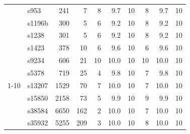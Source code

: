 \begin{table}[t]
\begin{tabular}{c l r r r r r r r r}
  & s953   &   241 &   7 &  8 &  9.7 & 10 &  8 &  9.7 & 10 \\
  & s1196b &   300 &   5 &  6 &  9.2 & 10 &  8 &  9.2 & 10 \\
  & s1238  &   301 &   5 &  6 &  9.2 & 10 &  8 &  9.2 & 10 \\
  & s1423  &   378 &  10 &  6 &  9.6 & 10 &  6 &  9.6 & 10 \\
  & s9234  &   606 &  21 & 10 & 10.0 & 10 & 10 & 10.0 & 10 \\
  & s5378  &   719 &  25 &  4 &  9.8 & 10 &  7 &  9.8 & 10 \\
\cmidrule(lr){1-10}
\multirow{4}{*}{\rotatebox[origin=c]{90}{\textit{Large}}}
  & s13207 &  1529 &  70 &  7 & 10.0 & 10 &  7 & 10.0 & 10 \\
  & s15850 &  2158 &  73 &  5 &  9.9 & 10 &  9 &  9.9 & 10 \\
  & s38584 &  6650 & 162 &  2 & 10.0 & 10 &  7 & 10.0 & 10 \\
  & s35932 &  5255 & 209 &  3 & 10.0 & 10 &  8 & 10.0 & 10 \\
\bottomrule
\end{tabular}
\end{table}

